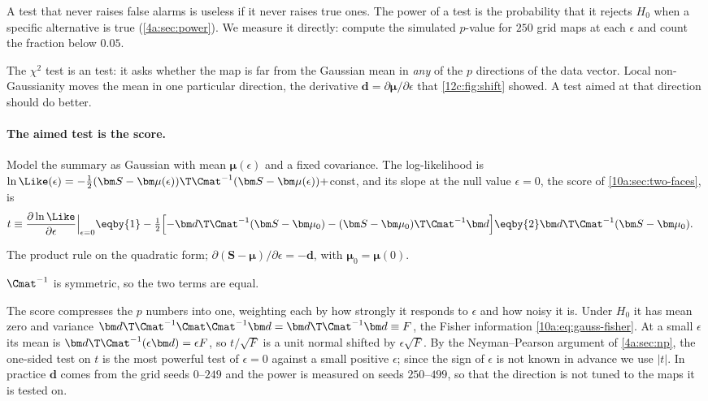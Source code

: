A test that never raises false alarms is useless if it never raises true ones. The power of a test is the probability that it
rejects $H_0$ when a specific alternative is true (\cref{4a:sec:power}). We measure it directly: compute the simulated
$p$-value for $250$ grid maps at each $\epsilon$ and count the fraction below $0.05$.

The $\chi^2$ test is an  test: it asks whether the map is far from the Gaussian mean in \emph{any} of the
$p$ directions of the data vector. Local non-Gaussianity moves the mean in one particular direction, the derivative
$\bm d=\partial\bm\mu/\partial\epsilon$ that \cref{12c:fig:shift} showed. A test aimed at that direction should do better.

\paragraph{The aimed test is the score.} Model the summary as Gaussian with mean $\bm\mu(\epsilon)$ and a fixed covariance.
The log-likelihood is $\ln\Like(\epsilon)=-\frac12(\bm S-\bm\mu(\epsilon))\T\Cmat^{-1}(\bm S-\bm\mu(\epsilon))+$const, and its
slope at the null value $\epsilon=0$, the score of \cref{10a:sec:two-faces}, is
\begin{align}
  t\equiv\frac{\partial\ln\Like}{\partial\epsilon}\Big|_{\epsilon=0}
  &\eqby{1}-\tfrac12\Bigl[-\bm d\T\Cmat^{-1}(\bm S-\bm\mu_0)-(\bm S-\bm\mu_0)\T\Cmat^{-1}\bm d\Bigr]
   \eqby{2}\bm d\T\Cmat^{-1}(\bm S-\bm\mu_0) .
  \label{12c:eq:score}
\end{align}
\begin{explain}
  \item The product rule on the quadratic form; $\partial(\bm S-\bm\mu)/\partial\epsilon=-\bm d$, with $\bm\mu_0=\bm\mu(0)$.
  \item $\Cmat^{-1}$ is symmetric, so the two terms are equal.
\end{explain}
The score compresses the $p$ numbers into one, weighting each by how strongly it responds to $\epsilon$ and how noisy it is.
Under $H_0$ it has mean zero and variance $\bm d\T\Cmat^{-1}\Cmat\Cmat^{-1}\bm d=\bm d\T\Cmat^{-1}\bm d\equiv F$, the Fisher
information \eqref{10a:eq:gauss-fisher}. At a small $\epsilon$ its mean is $\bm d\T\Cmat^{-1}(\epsilon\bm d)=\epsilon F$, so
$t/\sqrt F$ is a unit normal shifted by $\epsilon\sqrt F$. By the Neyman--Pearson argument of \cref{4a:sec:np}, the one-sided test on $t$ is the most powerful
test of $\epsilon=0$ against a small positive $\epsilon$; since the sign of $\epsilon$ is not known in advance we use $|t|$. In practice $\bm d$ comes from the grid seeds $0$--$249$ and the power
is measured on seeds $250$--$499$, so that the direction is not tuned to the maps it is tested on.

